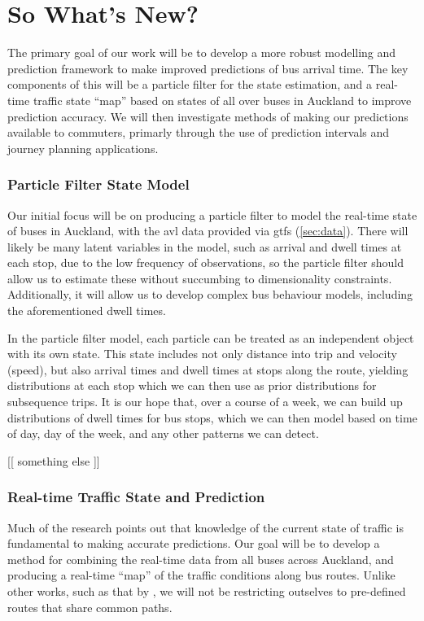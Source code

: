 \documentclass[12pt,a4paper]{article}
\begin{document}
\section{So What's New?}
\label{sec:whatsnew}

The primary goal of our work will be to develop a more robust modelling
and prediction framework to make improved predictions of bus arrival time.
The key components of this will be a particle filter for the state estimation,
and a real-time traffic state ``map'' based on states of all over buses in Auckland
to improve prediction accuracy.
We will then investigate methods of making our predictions available to commuters,
primarly through the use of prediction intervals and journey planning applications.


\subsubsection*{Particle Filter State Model}

Our initial focus will be on producing a particle filter to model the real-time state
of buses in Auckland,
with the \gls{avl} data provided via \gls{gtfs} (\cref{sec:data}).
There will likely be many latent variables in the model, 
such as arrival and dwell times at each stop,
due to the low frequency of observations,
so the particle filter should allow us to estimate these without 
succumbing to dimensionality constraints.
Additionally, it will allow us to develop complex bus behaviour models,
including the aforementioned dwell times.


In the particle filter model,
each particle can be treated as an independent object with its own state.
This state includes not only distance into trip and velocity (speed),
but also arrival times and dwell times at stops along the route,
yielding distributions at each stop which we can then
use as prior distributions for subsequence trips.
It is our hope that, over a course of a week,
we can build up distributions of dwell times for bus stops,
which we can then model based on time of day, day of the week,
and any other patterns we can detect.


[[ something else ]]



\subsubsection*{Real-time Traffic State and Prediction}

Much of the research points out that knowledge of the current state of traffic 
is fundamental to making accurate predictions.
Our goal will be to develop a method for combining the real-time data from
all buses across Auckland, 
and producing a real-time ``map'' of the traffic conditions along bus routes.
Unlike other works, such as that by \cite{yu-etal:2010},
we will not be restricting outselves to pre-defined routes that share common paths.
\end{document}
